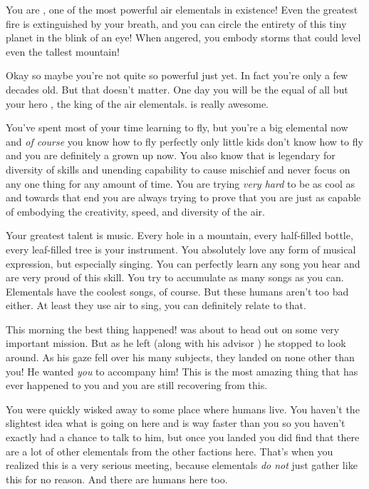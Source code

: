 \documentclass[char]{elementals}
\begin{document}
\name{\cMiniAir{}}

You are \cMiniAir{\intro}, one of the most powerful air elementals in existence! Even the greatest fire is extinguished by your breath, and you can circle the entirety of this tiny planet in the blink of an eye! When angered, you embody storms that could level even the tallest mountain!

Okay so maybe you're not quite so powerful just yet. In fact you're only a few decades old. But that doesn't matter. One day you will be the equal of all but your hero \cKing{\intro}, the king of the air elementals. \cKing{\They} is really awesome.

You've spent most of your time learning to fly, but you're a big elemental now and \emph{of course} you know how to fly perfectly only little kids don't know how to fly and you are definitely a grown up now. You also know that \cKing{} is legendary for \cKing{\their} diversity of skills and unending capability to cause mischief and never focus on any one thing for any amount of time. You are trying \emph{very hard} to be as cool as \cKing{} and towards that end you are always trying to prove that you are just as capable of embodying the creativity, speed, and diversity of the air.

Your greatest talent is music. Every hole in a mountain, every half-filled bottle, every leaf-filled tree is your instrument. You absolutely love any form of musical expression, but especially singing. You can perfectly learn any song you hear and are very proud of this skill. You try to accumulate as many songs as you can. Elementals have the coolest songs, of course. But these humans aren't too bad either. At least they use air to sing, you can definitely relate to that.

This morning the best thing happened! \cKing{} was about to head out on some very important mission. But as he left (along with his advisor \cNaturalist{}) he stopped to look around. As his gaze fell over his many subjects, they landed on none other than you! He wanted \emph{you} to accompany him! This is the most amazing thing that has ever happened to you and you are still recovering from this.

You were quickly wisked away to some place where humans live. You haven't the slightest idea what is going on here and \cKing{} is way faster than you so you haven't exactly had a chance to talk to him, but once you landed you did find that there are a lot of other elementals from the other factions here. That's when you realized this is a very serious meeting, because elementals \emph{do not} just gather like this for no reason. And there are humans here too.
\end{document}
